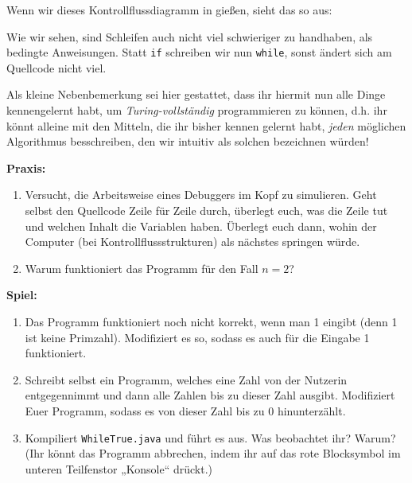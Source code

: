 \pagebreak

Wenn wir dieses Kontrollflussdiagramm in \Java gießen, sieht das so aus:


Wie wir sehen, sind Schleifen auch nicht viel schwieriger zu handhaben, als
bedingte Anweisungen. Statt \texttt{if} schreiben wir nun \texttt{while}, sonst
ändert sich am Quellcode nicht viel.

Als kleine Nebenbemerkung sei hier gestattet, dass ihr hiermit nun alle Dinge
kennengelernt habt, um \emph{Turing-vollständig} programmieren zu können, d.h.
ihr könnt alleine mit den Mitteln, die ihr bisher kennen gelernt
habt, \emph{jeden} möglichen Algorithmus besschreiben, den wir intuitiv als
solchen bezeichnen würden!

\textbf{Praxis:}
\begin{enumerate}
\item Versucht, die Arbeitsweise eines Debuggers im Kopf zu simulieren. Geht selbst den
  Quellcode Zeile für Zeile durch, überlegt euch, was die Zeile tut und welchen
  Inhalt die Variablen haben. Überlegt euch dann, wohin der Computer (bei
  Kontrollflussstrukturen) als nächstes springen würde.
\item Warum funktioniert das Programm für den Fall $n = 2$?
\end{enumerate}

\textbf{Spiel:}
\begin{enumerate}
\item Das Programm funktioniert noch nicht korrekt, wenn man 1 eingibt (denn 1
  ist keine Primzahl). Modifiziert es so, sodass es auch für die Eingabe 1
  funktioniert.
\item Schreibt selbst ein Programm, welches eine Zahl von der Nutzerin
  entgegennimmt und dann alle Zahlen bis zu dieser Zahl ausgibt. Modifiziert
  Euer Programm, sodass es von dieser Zahl bis zu 0 hinunterzählt.
\item Kompiliert \texttt{WhileTrue.java} und führt es aus. Was beobachtet ihr?
  Warum? (Ihr könnt das Programm abbrechen, indem ihr auf das rote Blocksymbol
  im unteren Teilfenstor „Konsole“ drückt.)
\end{enumerate}
